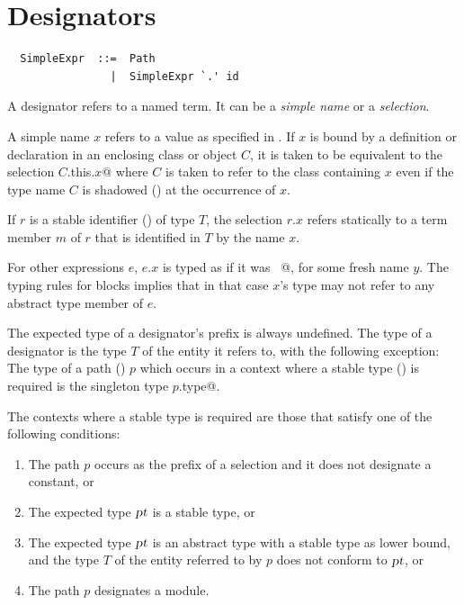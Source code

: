 \section{Designators}
\label{sec:designators}

\syntax\begin{lstlisting}
  SimpleExpr  ::=  Path
                |  SimpleExpr `.' id
\end{lstlisting}

A designator refers to a named term. It can be a {\em simple name} or
a {\em selection}. 

A simple name $x$ refers to a value as specified in .
If $x$ is bound by a definition or declaration in an enclosing class
or object $C$, it is taken to be equivalent to the selection
\lstinline@$C$.this.$x$@ where $C$ is taken to refer to the class containing $x$
even if the type name $C$ is shadowed () at the
occurrence of $x$.

If $r$ is a stable identifier
() of type $T$, the selection $r.x$ refers
statically to a term member $m$ of $r$ that is identified in $T$ by
the name $x$.   

For other expressions $e$, $e.x$ is typed as
if it was ~@, for some fresh name
$y$.  The typing rules for blocks implies that in that case $x$'s type
may not refer to any abstract type member of $e$.

The expected type of a designator's prefix is always undefined.  The
type of a designator is the type $T$ of the entity it refers to, with
the following exception: The type of a path () $p$
which occurs in a context where a stable type
() is required is the singleton type
\lstinline@$p$.type@.

The contexts where a stable type is required are those that satisfy
one of the following conditions:
\begin{enumerate}
\item
The path $p$ occurs as the prefix of a selection and it does not
designate a constant, or
\item
The expected type $\mbox{\sl pt}$ is a stable type, or
\item
The expected type $\mbox{\sl pt}$ is an abstract type with a stable type as lower
bound, and the type $T$ of the entity referred to by $p$ does not
conform to $\mbox{\sl pt}$, or
\item
The path $p$ designates a module.
\end{enumerate}

